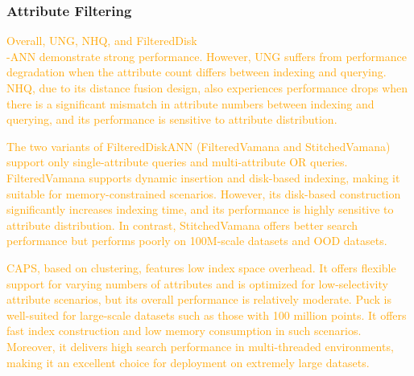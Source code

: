 \documentclass[sigconf, nonacm]{acmart}
\begin{document}
	
	\subsubsection{\textbf{Attribute Filtering}}
\textcolor{orange}{
Overall, UNG, NHQ, and FilteredDisk\\-ANN demonstrate strong performance. However, UNG suffers from performance degradation when the attribute count differs between indexing and querying. NHQ, due to its distance fusion design, also experiences performance drops when there is a significant mismatch in attribute numbers between indexing and querying, and its performance is sensitive to attribute distribution. }

\textcolor{orange}{The two variants of FilteredDiskANN (FilteredVamana and StitchedVamana) support only single-attribute queries and multi-attribute OR queries. FilteredVamana supports dynamic insertion and disk-based indexing, making it suitable for memory-constrained scenarios. However, its disk-based construction significantly increases indexing time, and its performance is highly sensitive to attribute distribution. In contrast, StitchedVamana offers better search performance but performs poorly on 100M-scale datasets and OOD datasets.}

\textcolor{orange}{
CAPS, based on clustering, features low index space overhead. It offers flexible support for varying numbers of attributes and is optimized for low-selectivity attribute scenarios, but its overall performance is relatively moderate.
Puck is well-suited for large-scale datasets such as those with 100 million points. It offers fast index construction and low memory consumption in such scenarios. Moreover, it delivers high search performance in multi-threaded environments, making it an excellent choice for deployment on extremely large datasets.}
\end{document}
